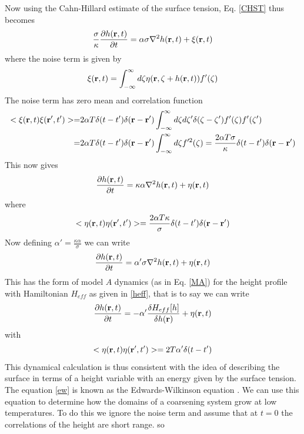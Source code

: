 Now using the Cahn-Hillard estimate of the surface tension, Eq. \eqref{CHST} thus becomes
\begin{equation}
\frac{\sigma}{\kappa} \frac{\partial h({\bf r},t)}{\partial t} = \alpha\sigma \nabla^2 h({\bf r},t) +\xi({\bf r},t)
\end{equation}
where the noise term is given by
\begin{equation}
\xi({\bf r},t)= \int_{-\infty}^\infty d\zeta \eta({\bf r},\zeta+ h({\bf r},t))f'(\zeta)
\end{equation}
The noise term has zero mean and correlation function
\begin{align}
< \xi({\bf r},t)\xi({\bf r}',t')> =&2\alpha T\delta(t-t')\delta({\bf r}-{\bf r}')\int_{-\infty}^\infty d\zeta d\zeta' \delta(\zeta-\zeta')f'(\zeta)f'(\zeta')\nonumber \\
=& 2\alpha T\delta(t-t')\delta({\bf r}-{\bf r}')\int_{-\infty}^\infty d\zeta f'^2(\zeta)= \frac{2\alpha T\sigma}{\kappa}\delta(t-t')\delta({\bf r}-{\bf r}')
\end{align}
This now gives
\begin{equation}
\frac{\partial h({\bf r},t)}{\partial t}= \kappa\alpha \nabla^2 h({\bf r},t) + \eta({\bf r},t)
\end{equation}
where 
\begin{equation}
< \eta({\bf r},t)\eta({\bf r}',t')> = \frac{2\alpha T\kappa}{\sigma}\delta(t-t')\delta({\bf r}-{\bf r}')
\end{equation}
Now defining $\alpha' = \frac{\kappa\alpha}{\sigma}$ we can write
\begin{equation}
\frac{\partial h({\bf r},t)}{\partial t}= \alpha' \sigma\nabla^2 h({\bf r},t) + \eta({\bf r},t)
\end{equation}
This has the form of model $A$ dynamics (as in Eq. \eqref{MA}) for the height profile with Hamiltonian
$H_{eff}$ as given in \eqref{heff}, that is to say we can write
\begin{equation}
\frac{\partial h({\bf r},t)}{\partial t}= -\alpha' \frac{\delta H_{eff}[h]}{\delta h({\bf r})} + \eta({\bf r},t)
\label{ew}
\end{equation}
with
\begin{equation}
< \eta({\bf r},t)\eta({\bf r}',t')>= 2T\alpha'\delta(t-t')
\end{equation}
This dynamical calculation is thus consistent with the idea of describing the surface in terms of a height variable with an energy given by the surface tension. The equation \eqref{ew} is known as the Edwards-Wilkinson equation \cite{edwards_surface_1982,halpin-healy_kinetic_1995}. We can use this equation to determine how the domains of a coarsening system grow at low temperatures. To do this we ignore the noise term and assume that at $t=0$ the correlations of the height are short range. so
